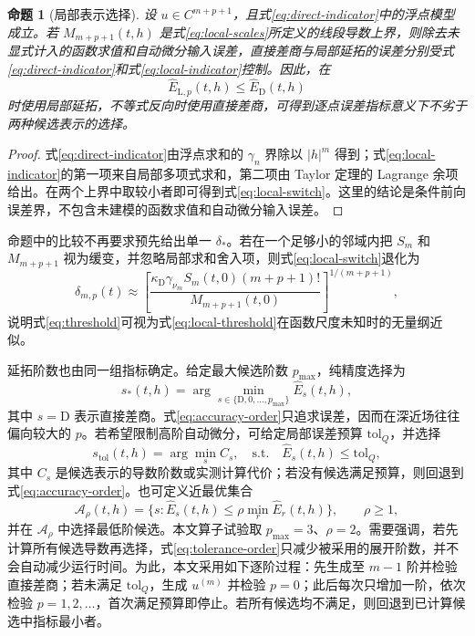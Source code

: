 \documentclass[UTF8,fontset=none,10.5pt,a4paper]{ctexart}
\numberwithin{equation}{section}
\newtheorem{proposition}{命题}
\begin{document}
\begin{proposition}[局部表示选择]
设 $u\in C^{m+p+1}$，且式\eqref{eq:direct-indicator}中的浮点模型成立。若 $M_{m+p+1}(t,h)$ 是式\eqref{eq:local-scales}所定义的线段导数上界，则除去未显式计入的函数求值和自动微分输入误差，直接差商与局部延拓的误差分别受式\eqref{eq:direct-indicator}和式\eqref{eq:local-indicator}控制。因此，在
\begin{equation}
\widehat E_{\mathrm L,p}(t,h)
\le \widehat E_{\mathrm D}(t,h)
\label{eq:local-switch}
\end{equation}
时使用局部延拓，不等式反向时使用直接差商，可得到逐点误差指标意义下不劣于两种候选表示的选择。
\end{proposition}
\begin{proof}
式\eqref{eq:direct-indicator}由浮点求和的 $\gamma_n$ 界除以 $|h|^m$ 得到；式\eqref{eq:local-indicator}的第一项来自局部多项式求和，第二项由 Taylor 定理的 Lagrange 余项给出。在两个上界中取较小者即可得到式\eqref{eq:local-switch}。这里的结论是条件前向误差界，不包含未建模的函数求值和自动微分输入误差。
\end{proof}

命题中的比较不再要求预先给出单一 $\delta_*$。若在一个足够小的邻域内把 $S_m$ 和 $M_{m+p+1}$ 视为缓变，并忽略局部求和舍入项，则式\eqref{eq:local-switch}退化为
\begin{equation}
\delta_{m,p}(t)
\approx
\left[
\frac{\kappa_{\mathrm D}\gamma_{\nu_m}S_m(t,0)(m+p+1)!}
{M_{m+p+1}(t,0)}
\right]^{1/(m+p+1)},
\label{eq:local-threshold}
\end{equation}
说明式\eqref{eq:threshold}可视为式\eqref{eq:local-threshold}在函数尺度未知时的无量纲近似。

延拓阶数也由同一组指标确定。给定最大候选阶数 $p_{\max}$，纯精度选择为
\begin{equation}
s_*(t,h)=\arg\min_{s\in\{\mathrm D,0,\ldots,p_{\max}\}}
\widehat E_s(t,h),
\label{eq:accuracy-order}
\end{equation}
其中 $s=\mathrm D$ 表示直接差商。式\eqref{eq:accuracy-order}只追求误差，因而在深近场往往偏向较大的 $p$。若希望限制高阶自动微分，可给定局部误差预算 $\mathrm{tol}_Q$，并选择
\begin{equation}
s_{\mathrm{tol}}(t,h)=
\arg\min_s C_s,
\quad
\text{s.t.}\quad \widehat E_s(t,h)\le\mathrm{tol}_Q,
\label{eq:tolerance-order}
\end{equation}
其中 $C_s$ 是候选表示的导数阶数或实测计算代价；若没有候选满足预算，则回退到式\eqref{eq:accuracy-order}。也可定义近最优集合
\begin{equation}
\mathcal A_\rho(t,h)=
\{s:\widehat E_s(t,h)\le\rho\min_r\widehat E_r(t,h)\},
\qquad \rho\ge1,
\label{eq:near-optimal-set}
\end{equation}
并在 $\mathcal A_\rho$ 中选择最低阶候选。本文算子试验取 $p_{\max}=3$、$\rho=2$。需要强调，若先计算所有候选导数再选择，式\eqref{eq:tolerance-order}只减少被采用的展开阶数，并不会自动减少运行时间。为此，本文采用如下逐阶过程：先生成至 $m-1$ 阶并检验直接差商；若未满足 $\mathrm{tol}_Q$，生成 $u^{(m)}$ 并检验 $p=0$；此后每次只增加一阶，依次检验 $p=1,2,\ldots$，首次满足预算即停止。若所有候选均不满足，则回退到已计算候选中指标最小者。
\end{document}
